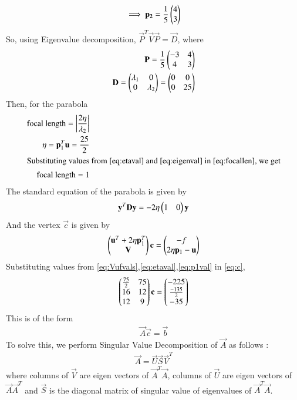 \documentclass[journal,12pt,twocolumn]{IEEEtran}
\begin{document}
\begin{align}
    \implies\mathbf{p_2}=\frac{1}{5}\begin{pmatrix}4\\3\end{pmatrix}\label{eq:p2val}
\end{align}
So, using Eigenvalue decomposition, $\vec{P}^T\vec{V}\vec{P}=\vec{D}$, where
\begin{align}
    \mathbf{P} = \frac{1}{5}\begin{pmatrix}-3 & 4\\4 & 3\end{pmatrix}\\
    \mathbf{D} = \begin{pmatrix}\lambda_1 & 0\\0 & \lambda_2\end{pmatrix} = \begin{pmatrix}0 & 0\\ 0 & 25\end{pmatrix}
\end{align}
Then, for the parabola
\begin{align}
    \text{focal length} = \left\vert\frac{2\eta}{\lambda_2}\right\vert \label{eq:focallen}\\
    \eta = \mathbf{p}_1^T\mathbf{u} = \frac{25}{2}\label{eq:etaval}\\
    \intertext{Substituting values from \eqref{eq:etaval} and \eqref{eq:eigenval} in \eqref{eq:focallen}, we get}
    \text{focal length} = 1
\end{align}
The standard equation of the parabola is given by
\begin{align}
    \mathbf{y}^T\mathbf{D}\mathbf{y} = -2\eta\begin{pmatrix}1 & 0\end{pmatrix}\mathbf{y}
\end{align}
And the vertex $\vec{c}$ is given by
\begin{align}
    \begin{pmatrix}\mathbf{u}^T + 2\eta\mathbf{p}_1^T \\ \mathbf{V}\end{pmatrix}\mathbf{c} = \begin{pmatrix}-f \\ 2\eta\mathbf{p}_1 - \mathbf{u}\end{pmatrix} \label{eq:c}
\end{align}
Substituting values from \eqref{eq:Vufvals},\eqref{eq:etaval},\eqref{eq:p1val} in \eqref{eq:c},
\begin{align}
    \begin{pmatrix}\frac{75}{2} & 75\\16 & 12\\12 & 9\end{pmatrix}\mathbf{c} = \begin{pmatrix}-225 \\ \frac{-135}{2} \\ -35\end{pmatrix}
\end{align}
This is of the form
\begin{align}
    \vec{A}\vec{c} = \vec{b}\label{eq:Acb}
\end{align}
To solve this, we perform Singular Value Decomposition of $\vec{A}$ as follows :
\begin{align}
    \vec{A} = \vec{U}\vec{S}\vec{V}^T\label{eq:Asvd}
\end{align}
where columns of $\vec{V}$ are eigen vectors of $\vec{A}^T\vec{A}$, columns of $\vec{U}$ are eigen vectors of $\vec{A}\vec{A}^T$ and $\vec{S}$ is the diagonal matrix of singular value of eigenvalues of $\vec{A}^T\vec{A}$.
\end{document}
